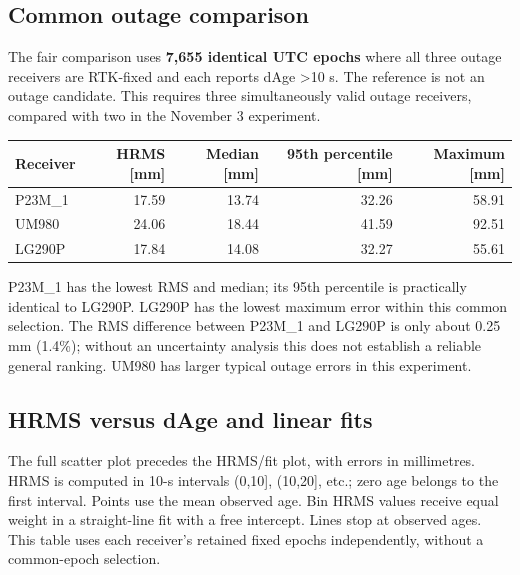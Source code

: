 \documentclass[11pt,a4paper]{article}
\numberwithin{equation}{section}
\numberwithin{figure}{section}
\begin{document}
\subsection{Common outage comparison}

The fair comparison uses \textbf{7,655 identical UTC epochs} where all three outage receivers are RTK-fixed and each reports dAge >10 s. The reference is not an outage candidate. This requires three simultaneously valid outage receivers, compared with two in the November 3 experiment.

\begin{center}\begin{lrbox}{\reporttable}\small\setlength{\tabcolsep}{4pt}\begin{tabular}{lrrrr}\toprule
Receiver & HRMS [mm] & Median [mm] & 95th percentile [mm] & Maximum [mm]\\\midrule
P23M\_1 & 17.59 & 13.74 & 32.26 & 58.91\\
UM980 & 24.06 & 18.44 & 41.59 & 92.51\\
LG290P & 17.84 & 14.08 & 32.27 & 55.61\\
\bottomrule\end{tabular}\end{lrbox}\ifdim\wd\reporttable>\linewidth\resizebox{\linewidth}{!}{\usebox{\reporttable}}\else\usebox{\reporttable}\fi\end{center}

P23M\_1 has the lowest RMS and median; its 95th percentile is practically identical to LG290P. LG290P has the lowest maximum error within this common selection. The RMS difference between P23M\_1 and LG290P is only about 0.25 mm (1.4\%); without an uncertainty analysis this does not establish a reliable general ranking. UM980 has larger typical outage errors in this experiment.

\subsection{HRMS versus dAge and linear fits}

The full scatter plot precedes the HRMS/\allowbreak{}fit plot, with errors in millimetres. HRMS is computed in 10-s intervals (0,10], (10,20], etc.; zero age belongs to the first interval. Points use the mean observed age. Bin HRMS values receive equal weight in a straight-line fit with a free intercept. Lines stop at observed ages. This table uses each receiver’s retained fixed epochs independently, without a common-epoch selection.
\end{document}

